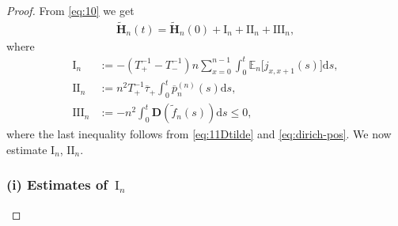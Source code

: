 \documentclass[EJP]{ejpecp} %
\newcommand\bbE{{\mathbb E}}
\newcommand{\dd  }{\mathrm{d}}
\renewcommand{\tilde}{\widetilde}
\renewcommand{\bar}{\overline}
\numberwithin{equation}{section}
\begin{document}
\begin{proof}
From \eqref{eq:10} we get
\begin{align}
  \label{eq:10a}
\tilde{\mathbf{H}}_n(t)=\tilde{\mathbf{H}}_n(0)+ \mathrm{I}_n+\mathrm{II}_n+\mathrm{III}_n,
\end{align}
where
\begin{align*}
\mathrm{I}_n & := -\left(T_+^{-1} - T_-^{-1}\right) n\sum_{x=0}^{n-1}\int_0^t
  \bbE_n\Big[ j_{x,x+1}(s)\Big]\dd s ,\\
\mathrm{II}_n & :=n^2 T_+^{-1} \bar\tau_+\int_0^t\bar p_n^{(n)}(s)\dd s,
\\
\mathrm{III}_n& :=  - n^2 \int_0^t\mathbf D(\tilde f_n(s))\dd s \leqslant 0, 
\end{align*}
where the last inequality follows from \eqref{eq:11Dtilde} and \eqref{eq:dirich-pos}. We now estimate $\mathrm{I}_n$, $\mathrm{II}_n$. 



\subsubsection*{(i) Estimates of $\,\mathrm{I}_n$}



\end{proof}
\end{document}
